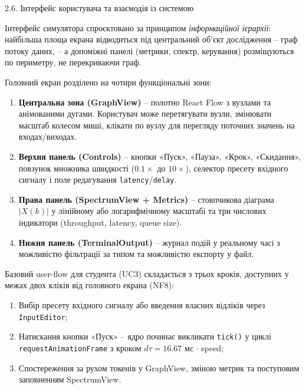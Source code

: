 \documentclass[
]{article}
\newcommand{\passthrough}[1]{#1}
\begin{document}
\protect{}\label{X7bbc68d42b10b5c417bba592a2604c867cb2c07}{}2.6.
Інтерфейс користувача та взаємодія із системою

Інтерфейс симулятора спроєктовано за принципом \emph{інформаційної
ієрархії}: найбільша площа екрана відводиться під центральний об'єкт
дослідження -- граф потоку даних, -- а допоміжні панелі (метрики,
спектр, керування) розміщуються по периметру, не перекриваючи граф.

Головний екран розділено на чотири функціональні зони:

\begin{enumerate}
\def\labelenumi{\arabic{enumi})}
\item
  \textbf{Центральна зона (GraphView)} -- полотно React Flow з вузлами
  та анімованими дугами. Користувач може перетягувати вузли, змінювати
  масштаб колесом миші, клікати по вузлу для перегляду поточних значень
  на входах/виходах.
\item
  \textbf{Верхня панель (Controls)} -- кнопки «Пуск», «Пауза», «Крок»,
  «Скидання», повзунок множника швидкості (\(0.1 \times\) до
  \(10 \times\)), селектор пресету вхідного сигналу і поле редагування
  \passthrough{\lstinline!latency!}/\passthrough{\lstinline!delay!}.
\item
  \textbf{Права панель (SpectrumView + Metrics)} -- стовпчикова діаграма
  \(|X(k)|\) у лінійному або логарифмічному масштабі та три числових
  індикатори (throughput, latency, queue size).
\item
  \textbf{Нижня панель (TerminalOutput)} -- журнал подій у реальному
  часі з можливістю фільтрації за типом та можливістю експорту у файл.
\end{enumerate}

Базовий user-flow для студента (UC3) складається з трьох кроків,
доступних у межах двох кліків від головного екрана (NF8):

\begin{enumerate}
\def\labelenumi{\arabic{enumi})}
\item
  Вибір пресету вхідного сигналу або введення власних відліків через
  \passthrough{\lstinline!InputEditor!};
\item
  Натискання кнопки «Пуск» -- ядро починає викликати
  \passthrough{\lstinline!tick!}\passthrough{\lstinline!()!} у циклі
  \passthrough{\lstinline!requestAnimationFrame!} з кроком
  \(d\tau = 16.67\) мс \(\cdot\) speed;
\item
  Спостереження за рухом токенів у GraphView, зміною метрик та
  поступовим заповненням SpectrumView.
\end{enumerate}
\end{document}
